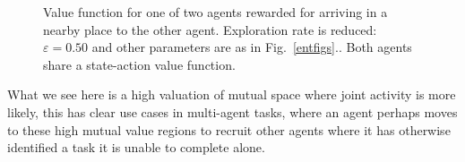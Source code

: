 \documentclass{article}
\begin{document}
\begin{figure}[ht]
\centering
{}
	\caption{Value function for one of two agents rewarded for arriving in a nearby place to the other agent. Exploration rate is reduced: $\varepsilon = 0.50$ and other parameters are 
	as in Fig.~\ref{entfigs}.\label{social}. 
	Both agents share a state-action value function.}
\end{figure}


What we see here is a high valuation of mutual space where joint activity is more likely, this has clear use cases in multi-agent tasks, where an agent perhaps moves to these high mutual value regions to recruit other agents where it has otherwise identified a task it is unable to complete alone.
\end{document}
